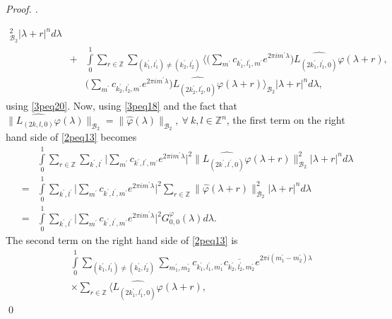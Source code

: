 \documentclass[a4paper,12pt,reqno]{amsart}
\theoremstyle{plain}
\numberwithin{equation}{section}
\theoremstyle{definition}
\newenvironment{pf}[1][]{%
 \vskip 3mm
 \noindent
 \ifthenelse{\equal{#1}{}}%
  {{\slshape Proof. }}%
  {{\slshape #1.} }%
 }%
{\qed\bigskip}
\begin{document}
\begin{pf}
\begin{eqnarray}
_{\mathcal{B}_{2}}^{2}|\lambda+r|^{n}d\lambda\nonumber\\
&+&\int\limits_{0}^{1}\sum\limits_{r\in\mathbb{Z}}
\sum\limits_{(k_{1}^{\prime},l_{1}^{\prime})\neq (k_{2}^{\prime},l_{2}^{\prime})}\bigg\langle\bigg(\sum\limits_{m^{\prime}}c_{k_{1}^{\prime},l_{1}^{\prime},m^{\prime}}e^{2\pi i m^{\prime}\lambda}\bigg)\widehat{L_{(2k_{1}^{\prime},l_{1}^{\prime},0)}\varphi}(\lambda+r),\nonumber\\
&&\bigg(\sum\limits_{m^{\prime}}c_{k_{2}^{\prime},l_{2}^{\prime},m^{\prime}}e^{2\pi i m^{\prime}\lambda}\bigg)\widehat{L_{(2k_{2}^{\prime},l_{2}^{\prime},0)}\varphi}(\lambda+r)\bigg\rangle
_{\mathcal{B}_{2}}|\lambda+r|^{n}d\lambda,\label{2peq13}
\end{eqnarray}
using \eqref{3peq20}. Now, using \eqref{3peq18} and the fact that $\|\widehat{L_{(2k,l,0)}\varphi}(\lambda)\|_{\mathcal{B}_{2}}=\|\widehat{\varphi}(\lambda)\|_{\mathcal{B}_{2}},~\forall~ k,l\in\mathbb{Z}^{n}$, the first term on the right hand side of \eqref{2peq13} becomes
\begin{eqnarray}
&&\int\limits_{0}^{1}\sum\limits_{r\in\mathbb{Z}}\sum\limits_{k^{\prime},l^{\prime}}
\bigg|\sum\limits_{m^{\prime}}c_{k^{\prime},l^{\prime},m^{\prime}} e^{2\pi im^{\prime}\lambda}\bigg|^{2}\|\widehat{L_{(2k^{\prime},l^{\prime},0)}\varphi}(\lambda+r)\|
_{\mathcal{B}_{2}}^{2}|\lambda+r|^{n}d\lambda\nonumber\\
&=&\int\limits_{0}^{1}\sum\limits_{k^{\prime},l^{\prime}}
\bigg|\sum\limits_{m^{\prime}}c_{k^{\prime},l^{\prime},m^{\prime}} e^{2\pi im^{\prime}\lambda}\bigg|^{2}\sum\limits_{r\in\mathbb{Z}}\|\widehat{\varphi}
(\lambda+r)\|_{\mathcal{B}_{2}}^{2}|\lambda+r|^{n}d\lambda\nonumber\\
&=&\int\limits_{0}^{1}\sum\limits_{k^{\prime},l^{\prime}}
\bigg|\sum\limits_{m^{\prime}}c_{k^{\prime},l^{\prime},m^{\prime}} e^{2\pi im^{\prime}\lambda}\bigg|^{2}G_{0,0}^{\varphi}(\lambda)d\lambda.\label{2peq15}
\end{eqnarray}
The second term on the right hand side of \eqref{2peq13} is
\begin{eqnarray*}
&&\int\limits_{0}^{1}
\sum\limits_{(k_{1}^{\prime},l_{1}^{\prime})\neq (k_{2}^{\prime},l_{2}^{\prime})}\sum\limits_{m_{1}^{\prime},m_{2}^{\prime}}
c_{k_{1}^{\prime},l_{1}^{\prime},m_{1}^{\prime}}\overline{c_{k_{2}^{\prime},l_{2}^{\prime},m_{2}^{\prime}}}e^{2\pi i(m_{1}^{\prime}-m_{2}^{\prime})\lambda}\\
&&\times\sum\limits_{r\in\mathbb{Z}}\langle\widehat{L_{(2k_{1}^{\prime},l_{1}^{\prime},0)}\varphi}(\lambda+r),

\end{eqnarray*}
\end{pf}
\end{document}
